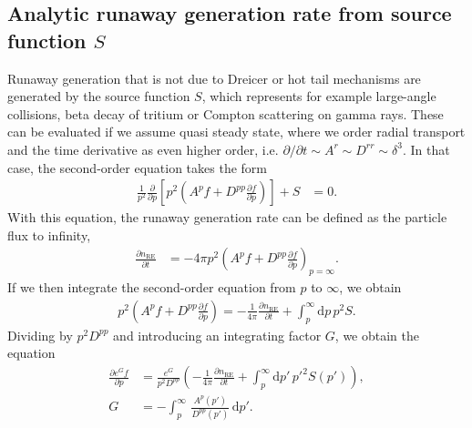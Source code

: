 \documentclass[11pt,a4paper]{article}
\newcommand{\rd}{\ensuremath{\mathrm{d}}}
\newcommand{\sub}[1]{\ensuremath{_{\text{#1}}}}
\begin{document}
%




\subsection{Analytic runaway generation rate from source function $S$}
Runaway generation that is not due to Dreicer or hot tail mechanisms are generated by the source function $S$, which represents for example large-angle collisions, beta decay of tritium or Compton scattering on gamma rays. These can be evaluated if we assume quasi steady state, where we order radial transport and the time derivative as even higher order, i.e. $\partial/\partial t \sim A^r \sim D^{rr} \sim \delta^3$. In that case, the second-order equation takes the form
\begin{align}
\frac{1}{p^2}\frac{\partial}{\partial p}\left[ p^2\left(A^pf + D^{pp}\frac{\partial f}{\partial p}\right)\right] + S &= 0.
\end{align}
With this equation, the runaway generation rate can be defined as the particle flux to infinity,
\begin{align}
\frac{\partial n\sub{RE}}{\partial t} &= -4\pi p^2\left(A^pf + D^{pp}\frac{\partial f}{\partial p}\right)_{\!\!p=\infty}.
\end{align}
If we then integrate the second-order equation from $p$ to $\infty$, we obtain
\begin{align}
 p^2\left(A^pf + D^{pp}\frac{\partial f}{\partial p}\right) = -\frac{1}{4\pi}\frac{\partial n\sub{RE}}{\partial t} + \int_p^\infty \rd p \, p^2S .
\end{align}
Dividing by $p^2 D^{pp}$ and introducing an integrating factor $G$, we obtain the equation
\begin{align}
\frac{\partial e^Gf}{\partial p} &= \frac{ e^G}{p^2 D^{pp}}\left(-\frac{1}{4\pi}\frac{\partial n\sub{RE}}{\partial t} + \int_p^\infty \rd p' \, p'^2S(p')\right), \nonumber \\
G &= -\int_p^\infty \,\frac{A^p(p')}{D^{pp}(p')}\,\rd p'.
\end{align}
\end{document}
